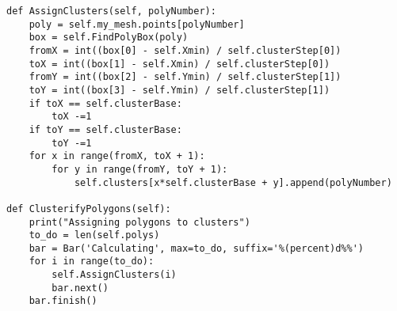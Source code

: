 \documentclass[a4paper,12pt,twoside,openany]{report}
\begin{document}
      \begin{lstlisting}
def AssignClusters(self, polyNumber):
    poly = self.my_mesh.points[polyNumber]
    box = self.FindPolyBox(poly)
    fromX = int((box[0] - self.Xmin) / self.clusterStep[0])
    toX = int((box[1] - self.Xmin) / self.clusterStep[0])
    fromY = int((box[2] - self.Ymin) / self.clusterStep[1])
    toY = int((box[3] - self.Ymin) / self.clusterStep[1])
    if toX == self.clusterBase:
        toX -=1
    if toY == self.clusterBase:
        toY -=1
    for x in range(fromX, toX + 1):
        for y in range(fromY, toY + 1):
            self.clusters[x*self.clusterBase + y].append(polyNumber)
    
def ClusterifyPolygons(self):
    print("Assigning polygons to clusters")
    to_do = len(self.polys)
    bar = Bar('Calculating', max=to_do, suffix='%(percent)d%%')
    for i in range(to_do):
        self.AssignClusters(i)
        bar.next()
    bar.finish()
      \end{lstlisting}


















































\begin{thebibliography}{99}

\end{thebibliography}
\end{document}
